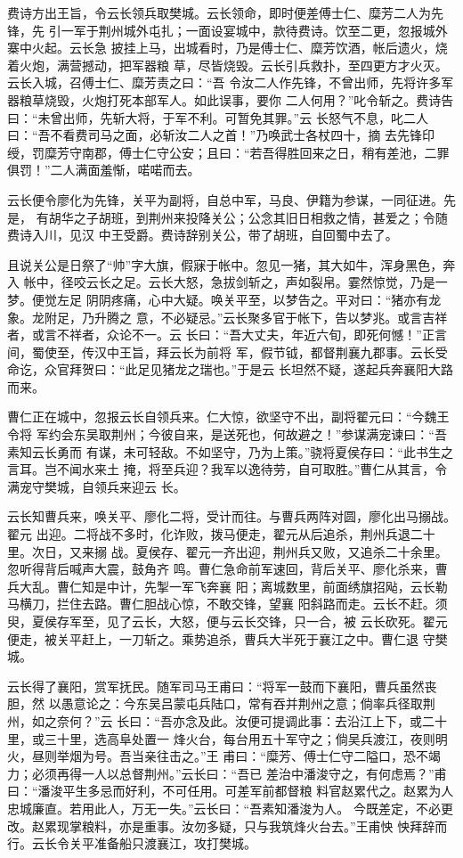 费诗方出王旨，令云长领兵取樊城。云长领命，即时便差傅士仁、糜芳二人为先锋，先
引一军于荆州城外屯扎；一面设宴城中，款待费诗。饮至二更，忽报城外寨中火起。云长急
披挂上马，出城看时，乃是傅士仁、糜芳饮酒，帐后遗火，烧着火炮，满营撼动，把军器粮
草，尽皆烧毁。云长引兵救扑，至四更方才火灭。云长入城，召傅士仁、糜芳责之曰：“吾
令汝二人作先锋，不曾出师，先将许多军器粮草烧毁，火炮打死本部军人。如此误事，要你
二人何用？”叱令斩之。费诗告曰：“未曾出师，先斩大将，于军不利。可暂免其罪。”云
长怒气不息，叱二人曰：“吾不看费司马之面，必斩汝二人之首！”乃唤武士各杖四十，摘
去先锋印绶，罚糜芳守南郡，傅士仁守公安；且曰：“若吾得胜回来之日，稍有差池，二罪
俱罚！”二人满面羞惭，喏喏而去。

云长便令廖化为先锋，关平为副将，自总中军，马良、伊籍为参谋，一同征进。先是，
有胡华之子胡班，到荆州来投降关公；公念其旧日相救之情，甚爱之；令随费诗入川，见汉
中王受爵。费诗辞别关公，带了胡班，自回蜀中去了。

且说关公是日祭了“帅”字大旗，假寐于帐中。忽见一猪，其大如牛，浑身黑色，奔入
帐中，径咬云长之足。云长大怒，急拔剑斩之，声如裂帛。霎然惊觉，乃是一梦。便觉左足
阴阴疼痛，心中大疑。唤关平至，以梦告之。平对曰：“猪亦有龙象。龙附足，乃升腾之
意，不必疑忌。”云长聚多官于帐下，告以梦兆。或言吉祥者，或言不祥者，众论不一。云
长曰：“吾大丈夫，年近六旬，即死何憾！”正言间，蜀使至，传汉中王旨，拜云长为前将
军，假节钺，都督荆襄九郡事。云长受命讫，众官拜贺曰：“此足见猪龙之瑞也。”于是云
长坦然不疑，遂起兵奔襄阳大路而来。

曹仁正在城中，忽报云长自领兵来。仁大惊，欲坚守不出，副将翟元曰：“今魏王令将
军约会东吴取荆州；今彼自来，是送死也，何故避之！”参谋满宠谏曰：“吾素知云长勇而
有谋，未可轻敌。不如坚守，乃为上策。”骁将夏侯存曰：“此书生之言耳。岂不闻水来土
掩，将至兵迎？我军以逸待劳，自可取胜。”曹仁从其言，令满宠守樊城，自领兵来迎云
长。

云长知曹兵来，唤关平、廖化二将，受计而往。与曹兵两阵对圆，廖化出马搦战。翟元
出迎。二将战不多时，化诈败，拨马便走，翟元从后追杀，荆州兵退二十里。次日，又来搦
战。夏侯存、翟元一齐出迎，荆州兵又败，又追杀二十余里。忽听得背后喊声大震，鼓角齐
鸣。曹仁急命前军速回，背后关平、廖化杀来，曹兵大乱。曹仁知是中计，先掣一军飞奔襄
阳；离城数里，前面绣旗招飐，云长勒马横刀，拦住去路。曹仁胆战心惊，不敢交锋，望襄
阳斜路而走。云长不赶。须臾，夏侯存军至，见了云长，大怒，便与云长交锋，只一合，被
云长砍死。翟元便走，被关平赶上，一刀斩之。乘势追杀，曹兵大半死于襄江之中。曹仁退
守樊城。

云长得了襄阳，赏军抚民。随军司马王甫曰：“将军一鼓而下襄阳，曹兵虽然丧胆，然
以愚意论之：今东吴吕蒙屯兵陆口，常有吞并荆州之意；倘率兵径取荆州，如之奈何？”云
长曰：“吾亦念及此。汝便可提调此事：去沿江上下，或二十里，或三十里，选高阜处置一
烽火台，每台用五十军守之；倘吴兵渡江，夜则明火，昼则举烟为号。吾当亲往击之。”王
甫曰：“糜芳、傅士仁守二隘口，恐不竭力；必须再得一人以总督荆州。”云长曰：“吾已
差治中潘浚守之，有何虑焉？”甫曰：“潘浚平生多忌而好利，不可任用。可差军前都督粮
料官赵累代之。赵累为人忠城廉直。若用此人，万无一失。”云长曰：“吾素知潘浚为人。
今既差定，不必更改。赵累现掌粮料，亦是重事。汝勿多疑，只与我筑烽火台去。”王甫怏
怏拜辞而行。云长令关平准备船只渡襄江，攻打樊城。

